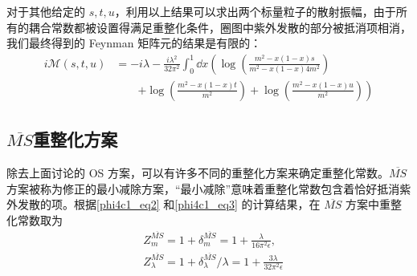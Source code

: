 对于其他给定的 $s,t,u$，利用以上结果可以求出两个标量粒子的散射振幅，由于所有的耦合常数都被设置得满足重整化条件，圈图中紫外发散的部分被抵消项相消，我们最终得到的 Feynman 矩阵元的结果是有限的：
\begin{equation}
\begin{aligned}
i\mathcal{M}(s,t,u)&=-i\lambda - \frac{i\lambda^2}{32\pi^2}\int_0^1 \dd x\left(\log\left(\frac{m^2-x(1-x)s}{m^2-x(1-x)4m^2}\right)\right.
\\
&\quad\quad\left.+
\log\left(\frac{m^2-x(1-x)t}{m^2}\right)
+
\log\left(\frac{m^2-x(1-x)u}{m^2}\right)
\right)
\end{aligned}
\end{equation}

\subsection{$\overline{MS}$重整化方案}

除去上面讨论的 OS 方案，可以有许多不同的重整化方案来确定重整化常数。$\overline{MS}$ 方案被称为修正的最小减除方案，“最小减除”意味着重整化常数包含着恰好抵消紫外发散的项。根据\autoref{phi4c1_eq2} 和\autoref{phi4c1_eq3} 的计算结果，在 $\overline{MS}$ 方案中重整化常数取为
\begin{equation}
\begin{aligned}
&Z^{\overline{MS}}_{m}=1+\delta^{\overline{MS}}_m = 1+\frac{\lambda}{16\pi^2\epsilon},\\
&Z^{\overline{MS}}_{\lambda} = 1+\delta_\lambda^{\overline{MS}}/\lambda = 1+\frac{3\lambda}{32\pi^2\epsilon}
\end{aligned}
\end{equation}
